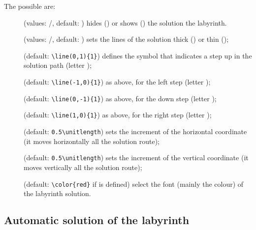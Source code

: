 \documentclass[a4paper,11pt,headinclude,footinclude]{scrartcl}
\begin{document}
\goodbreak
The possible  are:\nobreak
\begin{description}
	\item[] (values: /, default: ) hides () or shows () the solution  the labyrinth.
	\item[] (values: /, default: ) sets the lines of the solution thick () or thin ();
	\item[] (default: \lstinline!\line(0,1){1}!) defines the symbol that indicates a step up in the solution path (letter );
	\item[] (default: \lstinline!\line(-1,0){1}!) as above, for the left step (letter );
	\item[] (default: \lstinline!\line(0,-1){1}!) as above, for the down step (letter );
	\item[] (default: \lstinline!\line(1,0){1}!) as above, for the right step (letter );
	\item[] (default: \lstinline!0.5\unitlength!) sets the increment of the horizontal coordinate (it moves horizontally all the solution route);
	\item[] (default: \lstinline!0.5\unitlength!) sets the increment of the vertical coordinate (it moves vertically all the solution route);
	\item[] (default: \lstinline!\color{red}! if  is defined) select the font (mainly the colour) of the labyrinth solution.
\end{description}

\subsection{Automatic solution of the labyrinth}
\end{document}
